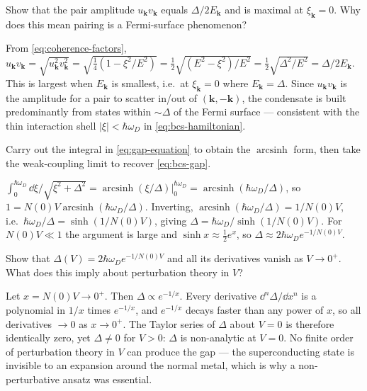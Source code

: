 \begin{exercise}
Show that the pair amplitude $u_{\mathbf k}v_{\mathbf k}$ equals
$\Delta/2E_{\mathbf k}$ and is maximal at $\xi_{\mathbf k}=0$. Why does
this mean pairing is a Fermi-surface phenomenon?
\begin{solution}
From \cref{eq:coherence-factors},
$u_{\mathbf k}v_{\mathbf k}=\sqrt{u_{\mathbf k}^2 v_{\mathbf k}^2}
=\sqrt{\tfrac14(1-\xi^2/E^2)}=\tfrac12\sqrt{(E^2-\xi^2)/E^2}
=\tfrac12\sqrt{\Delta^2/E^2}=\Delta/2E_{\mathbf k}$. This is largest
when $E_{\mathbf k}$ is smallest, i.e.\ at $\xi_{\mathbf k}=0$ where
$E_{\mathbf k}=\Delta$. Since $u_{\mathbf k}v_{\mathbf k}$ is the
amplitude for a pair to scatter in/out of $(\mathbf k,-\mathbf k)$, the
condensate is built predominantly from states within $\sim\Delta$ of
the Fermi surface --- consistent with the thin interaction shell
$|\xi|<\hbar\omega_D$ in \cref{eq:bcs-hamiltonian}.
\end{solution}
\end{exercise}

\begin{exercise}
Carry out the integral in \cref{eq:gap-equation} to obtain the
$\operatorname{arcsinh}$ form, then take the weak-coupling limit to
recover \cref{eq:bcs-gap}.
\begin{solution}
$\int_0^{\hbar\omega_D}\dd\xi/\sqrt{\xi^2+\Delta^2}
=\operatorname{arcsinh}(\xi/\Delta)\big|_0^{\hbar\omega_D}
=\operatorname{arcsinh}(\hbar\omega_D/\Delta)$, so
$1=N(0)V\operatorname{arcsinh}(\hbar\omega_D/\Delta)$. Inverting,
$\operatorname{arcsinh}(\hbar\omega_D/\Delta)=1/N(0)V$, i.e.\
$\hbar\omega_D/\Delta=\sinh(1/N(0)V)$, giving
$\Delta=\hbar\omega_D/\sinh(1/N(0)V)$. For $N(0)V\ll1$ the argument is
large and $\sinh x\approx\tfrac12 e^{x}$, so
$\Delta\approx2\hbar\omega_D e^{-1/N(0)V}$.
\end{solution}
\end{exercise}

\begin{exercise}
Show that $\Delta(V)=2\hbar\omega_D e^{-1/N(0)V}$ and all its
derivatives vanish as $V\to0^+$. What does this imply about
perturbation theory in $V$?
\begin{solution}
Let $x=N(0)V\to0^+$. Then $\Delta\propto e^{-1/x}$. Every derivative
$\dd^n\Delta/\dd x^n$ is a polynomial in $1/x$ times $e^{-1/x}$, and
$e^{-1/x}$ decays faster than any power of $x$, so all derivatives
$\to0$ as $x\to0^+$. The Taylor series of $\Delta$ about $V=0$ is
therefore identically zero, yet $\Delta\neq0$ for $V>0$: $\Delta$ is
non-analytic at $V=0$. No finite order of perturbation theory in $V$
can produce the gap --- the superconducting state is invisible to an
expansion around the normal metal, which is why a non-perturbative
ansatz was essential.
\end{solution}
\end{exercise}

